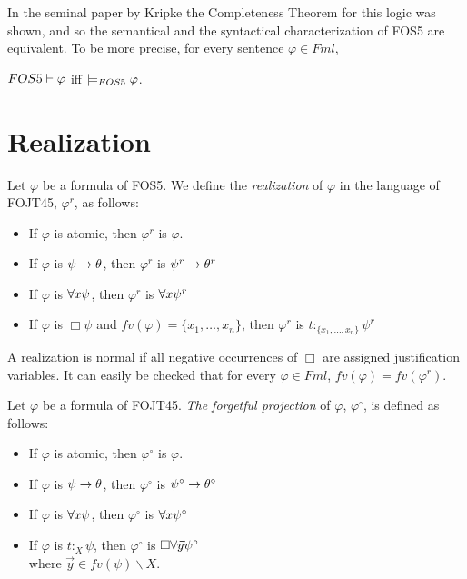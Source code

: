 \qquad 
In the seminal paper by Kripke \cite{Kripke59} the Completeness Theorem for this logic was shown, and so the semantical and the syntactical characterization of FOS5 are equivalent. To be more precise, for every sentence $\varphi \in Fml$,

\begin{center}
$FOS5\vdash \varphi$ iff  $\models_{FOS5} \varphi$.
\end{center}





\section{Realization}


\begin{defn}
Let $\varphi$ be a formula of FOS5. We define the \textit{realization} of $\varphi$ in the language of FOJT45, $\varphi^{r}$, as follows:


\begin{itemize}
	\item If $\varphi$ is atomic, then $\varphi^{r}$ is $\varphi$.
	\item If $\varphi$ is $\psi\rightarrow\theta$, then $\varphi^{r}$ is $\psi^{r}\rightarrow\theta^{r}$
	\item If $\varphi$ is $\forall x \psi$, then $\varphi^{r}$ is $\forall x \psi^{r}$
	\item If $\varphi$ is $\Box \psi$ and $fv(\varphi) = \{x_{1}, \dots, x_{n}\}$, then $\varphi^{r}$ is $t$$:_{\{x_{1}, \dots, x_{n}\}}$$ \psi^{r}$
\end{itemize}
\end{defn}

\qquad A realization is normal if all negative occurrences of $\Box$ are assigned justification variables. It can easily be checked that for every $\varphi \in Fml$, $fv(\varphi) = fv(\varphi^{r})$.



\begin{defn}
Let $\varphi$ be a formula of FOJT45. \textit{The forgetful projection} of $\varphi$, $\varphi^{\circ}$, is defined as follows:


\begin{itemize}
	\item If $\varphi$ is atomic, then $\varphi^{\circ}$ is $\varphi$.
	\item If $\varphi$ is $\psi\rightarrow\theta$, then $\varphi^{\circ}$ is $\psi^{\circ}\rightarrow\theta^{\circ}$
	\item If $\varphi$ is $\forall x \psi$, then $\varphi^{\circ}$ is $\forall x \psi^{\circ}$
	\item If $\varphi$ is $t$$:_{X}$$ \psi$, then $\varphi^{\circ}$ is $\Box \forall \vec{y}\psi^{\circ}$\\ where $\vec{y} \in fv(\psi)\backslash X$.
\end{itemize}
\end{defn}

